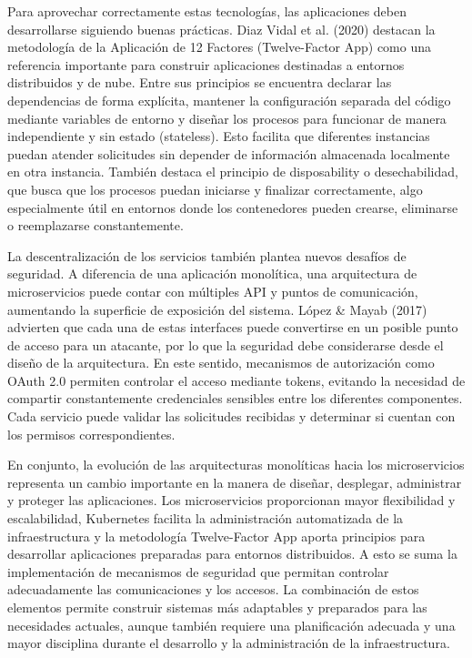 \documentclass[12pt,letterpaper]{article}
\begin{document}
Para aprovechar correctamente estas tecnologías, las aplicaciones deben desarrollarse siguiendo buenas prácticas. Diaz Vidal et al. (2020) destacan la metodología de la Aplicación de 12 Factores (Twelve-Factor App) como una referencia importante para construir aplicaciones destinadas a entornos distribuidos y de nube. Entre sus principios se encuentra declarar las dependencias de forma explícita, mantener la configuración separada del código mediante variables de entorno y diseñar los procesos para funcionar de manera independiente y sin estado (stateless). Esto facilita que diferentes instancias puedan atender solicitudes sin depender de información almacenada localmente en otra instancia. También destaca el principio de disposability o desechabilidad, que busca que los procesos puedan iniciarse y finalizar correctamente, algo especialmente útil en entornos donde los contenedores pueden crearse, eliminarse o reemplazarse constantemente.

La descentralización de los servicios también plantea nuevos desafíos de seguridad. A diferencia de una aplicación monolítica, una arquitectura de microservicios puede contar con múltiples API y puntos de comunicación, aumentando la superficie de exposición del sistema. López \& Mayab (2017) advierten que cada una de estas interfaces puede convertirse en un posible punto de acceso para un atacante, por lo que la seguridad debe considerarse desde el diseño de la arquitectura. En este sentido, mecanismos de autorización como OAuth 2.0 permiten controlar el acceso mediante tokens, evitando la necesidad de compartir constantemente credenciales sensibles entre los diferentes componentes. Cada servicio puede validar las solicitudes recibidas y determinar si cuentan con los permisos correspondientes.

En conjunto, la evolución de las arquitecturas monolíticas hacia los microservicios representa un cambio importante en la manera de diseñar, desplegar, administrar y proteger las aplicaciones. Los microservicios proporcionan mayor flexibilidad y escalabilidad, Kubernetes facilita la administración automatizada de la infraestructura y la metodología Twelve-Factor App aporta principios para desarrollar aplicaciones preparadas para entornos distribuidos. A esto se suma la implementación de mecanismos de seguridad que permitan controlar adecuadamente las comunicaciones y los accesos. La combinación de estos elementos permite construir sistemas más adaptables y preparados para las necesidades actuales, aunque también requiere una planificación adecuada y una mayor disciplina durante el desarrollo y la administración de la infraestructura.
\end{document}
